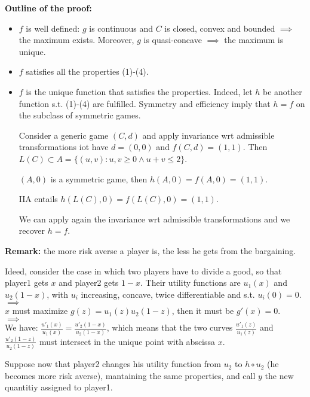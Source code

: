 \bigskip
\noindent \textbf{Outline of the proof:} 
\begin{itemize}
	\item $f$ is well defined: $g$ is continuous and $C$ is closed, convex and bounded $\implies$ the maximum exists. Moreover, $g$ is quasi-concave $\implies$ the maximum is unique.
	
	\item $f$ satisfies all the properties (1)-(4).
	
	\item $f$ is the unique function that satisfies the properties. Indeed, let $h$ be another function s.t. (1)-(4) are fulfilled. Symmetry and efficiency imply that $h = f$ on the subclass of symmetric games.
	
	\noindent Consider a generic game $(C,d)$ and apply invariance wrt admissible transformations iot have $d = (0,0)$ and $f(C,d) = (1,1)$. Then $L(C) \subset A = \{(u,v): u,v \geq 0 \wedge u+v \leq 2\}$.
	
	\noindent $(A,0)$ is a symmetric game, then $h(A,0) = f(A,0) = (1,1)$.
	
	\noindent IIA entails $h(L(C),0) = f(L(C),0) = (1,1)$.
	
	\noindent We can apply again the invariance wrt admissible transformations and we recover $h = f$.
\end{itemize}

\bigskip
\noindent \textbf{Remark:} the more risk averse a player is, the less he gets from the bargaining.

\noindent Ideed, consider the case in which two players have to divide a good, so that player1 gets $x$ and player2 gets $1-x$. Their utility functions are $u_1(x)$ and $u_2(1-x)$, with $u_i$ increasing, concave, twice differentiable and s.t. $u_i(0) = 0$.\\
$\implies$\\
$x$ must maximize $g(z) = u_1(z)u_2(1-z)$, then it must be $g'(x) = 0$.\\
$\implies$\\
We have: $\frac{u'_1(x)}{u_1(x)} = \frac{u'_2(1-x)}{u_2(1-x)}$, which means that the two curves $\frac{u'_1(z)}{u_1(z)}$ and $\frac{u'_2(1-z)}{u_2(1-z)}$ must intersect in the unique point with abscissa $x$.

\noindent Suppose now that player2 changes his utility function from $u_2$ to $h \circ u_2$ (he becomes more risk averse), mantaining the same properties, and call $y$ the new quantitiy assigned to player1.

